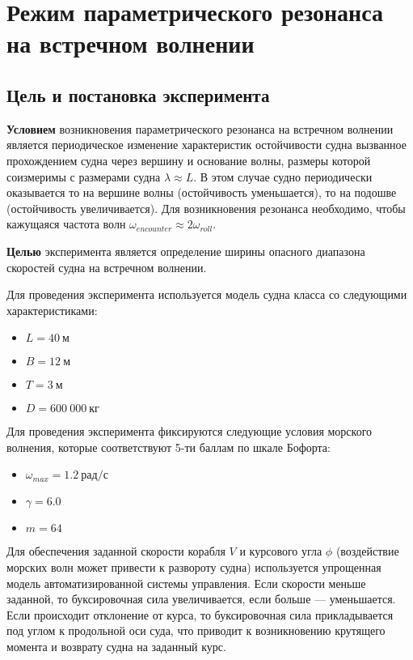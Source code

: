 \section{Режим параметрического резонанса на встречном волнении}

\subsection{Цель и постановка эксперимента}

\textbf{Условием} возникновения параметрического резонанса на встречном волнении является периодическое изменение характеристик остойчивости судна вызванное прохождением судна через вершину и основание волны, размеры которой соизмеримы с размерами судна $\lambda \approx L$. В этом случае судно периодически оказывается то на вершине волны (остойчивость уменьшается), то на подошве (остойчивость увеличивается). Для возникновения резонанса необходимо, чтобы кажущаяся частота волн $\omega_{encounter} \approx 2\omega_{roll}$.

\textbf{Целью} эксперимента является определение ширины опасного диапазона скоростей судна на встречном волнении.

Для проведения эксперимента используется модель судна класса  со следующими характеристиками:
\begin{itemize}
	\item	$L = 40\ \text{м}$
	\item	$B = 12\ \text{м}$
	\item	$T = 3\ \text{м}$
	\item	$D = 600\ 000\ \text{кг}$
\end{itemize}

Для проведения эксперимента фиксируются следующие условия морского волнения, которые соответствуют 5-ти баллам по шкале Бофорта:
\begin{itemize}
	\item	$\omega_{max} = 1.2\ \text{рад/с}$
	\item	$\gamma = 6.0$
	\item	$m = 64$
\end{itemize}

Для обеспечения заданной скорости корабля $V$ и курсового угла $\phi$ (воздействие морских волн может привести к развороту судна) используется упрощенная модель автоматизированной системы управления. Если скорости меньше заданной, то буксировочная сила увеличивается, если больше --- уменьшается. Если происходит отклонение от курса, то буксировочная сила прикладывается под углом к продольной оси суда, что приводит к возникновению крутящего момента и возврату судна на заданный курс.

